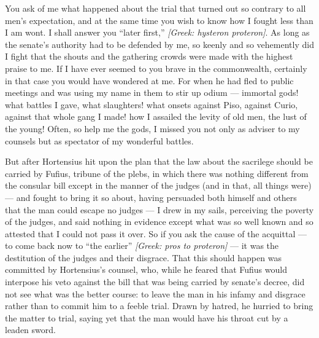 

 You ask of me what happened about the trial that turned out so contrary to all men's expectation, and at the same time you wish to know how I fought less than I am wont. I shall answer you ``later first,'' \textit{[Greek: hysteron proteron]}. As long as the senate's authority had to be defended by me, so keenly and so vehemently did I fight that the shouts and the gathering crowds were made with the highest praise to me. If I have ever seemed to you brave in the commonwealth, certainly in that case you would have wondered at me. For when he had fled to public meetings and was using my name in them to stir up odium --- immortal gods! what battles I gave, what slaughters! what onsets against Piso, against Curio, against that whole gang I made! how I assailed the levity of old men, the lust of the young! Often, so help me the gods, I missed you not only as adviser to my counsels but as spectator of my wonderful battles.

 But after Hortensius hit upon the plan that the law about the sacrilege should be carried by Fufius, tribune of the plebs, in which there was nothing different from the consular bill except in the manner of the judges (and in that, all things were) --- and fought to bring it so about, having persuaded both himself and others that the man could escape no judges --- I drew in my sails, perceiving the poverty of the judges, and said nothing in evidence except what was so well known and so attested that I could not pass it over. So if you ask the cause of the acquittal --- to come back now to ``the earlier'' \textit{[Greek: pros to proteron]} --- it was the destitution of the judges and their disgrace. That this should happen was committed by Hortensius's counsel, who, while he feared that Fufius would interpose his veto against the bill that was being carried by senate's decree, did not see what was the better course: to leave the man in his infamy and disgrace rather than to commit him to a feeble trial. Drawn by hatred, he hurried to bring the matter to trial, saying yet that the man would have his throat cut by a leaden sword.


